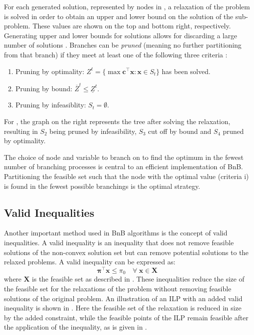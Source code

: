 For each generated solution, represented by nodes in , a relaxation of the problem is solved in order to obtain an upper and lower bound on the solution of the sub-problem. 
These values are shown on the top and bottom right, respectively. 
Generating upper and lower bounds for solutions allows for discarding a large number of solutions \cite{wolsey2020integer}. Branches can be \textit{pruned} (meaning no further partitioning from that branch) if they meet at least one of the following three criteria \cite{wolsey2020integer}:
\newpage
\begin{enumerate}[label=(\roman*)]
    \item Pruning by optimality: $Z^t = \{\max \bm{c}^{\top} \bm{x} : \bm{x} \in S_t\}$ has been solved.
    \item Pruning by bound: $\overline{Z}^t \leq \underline{Z}^t$.
    \item Pruning by infeasiblity: $S_t = \emptyset $.
\end{enumerate}
For , the graph on the right represents the tree after solving the relaxation, resulting in $S_2$ being pruned by infeasibility, $S_3$ cut off by bound and $S_4$ pruned by optimality.


The choice of node and variable to branch on to find the optimum in the fewest number of branching processes is central to an efficient implementation of \gls{BnB}. Partitioning the feasible set such that the node with the optimal value (criteria i) is found in the fewest possible branchings is the optimal strategy. 


\subsection{Valid Inequalities}\label{ssec:inequalities}

Another important method used in \gls{BnB} algorithms is the concept of valid inequalities. A valid inequality is an inequality that does not remove feasible solutions of the non-convex solution set but can remove potential solutions to the relaxed problems. A valid inequality can be expressed as:
\begin{equation}\label{eq:cut}
    \bm{\pi}^{\top} \bm{x} \leq \pi_0 \quad \forall \; \mathbf{x} \in  \bm{X}   
\end{equation}
where $\bm{X}$ is the feasible set as described in . These inequalities reduce the size of the feasible set for the relaxations of the problem without removing feasible solutions of the original problem. An illustration of an \gls{ILP} with an added valid inequality is shown in . Here the feasible set of the relaxation is reduced in size by the added constraint, while the feasible points of the \gls{ILP} remain feasible after the application of the inequality, as is given in .

